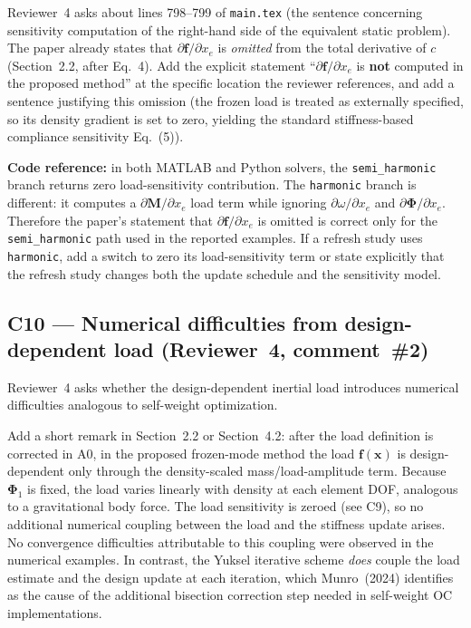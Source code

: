 \documentclass[12pt,a4paper]{article}
\begin{document}
Reviewer~4 asks about lines 798--799 of \texttt{main.tex} (the sentence
concerning sensitivity computation of the right-hand side of the
equivalent static problem). The paper already states that
$\partial\mathbf{f}/\partial x_e$ is \emph{omitted} from the total
derivative of $c$ (Section~2.2, after Eq.~4). Add the explicit statement
``$\partial\mathbf{f}/\partial x_e$ is \textbf{not} computed in the
proposed method'' at the specific location the reviewer references, and
add a sentence justifying this omission (the frozen load is treated as
externally specified, so its density gradient is set to zero, yielding the
standard stiffness-based compliance sensitivity Eq.~(5)).

\textbf{Code reference:} in both MATLAB and Python solvers, the
\texttt{semi\_harmonic} branch returns zero load-sensitivity contribution.
The \texttt{harmonic} branch is different: it computes a
$\partial\mathbf{M}/\partial x_e$ load term while ignoring
$\partial\omega/\partial x_e$ and
$\partial\boldsymbol{\Phi}/\partial x_e$.  Therefore the paper's statement
that $\partial\mathbf{f}/\partial x_e$ is omitted is correct only for the
\texttt{semi\_harmonic} path used in the reported examples.  If a refresh
study uses \texttt{harmonic}, add a switch to zero its load-sensitivity term
or state explicitly that the refresh study changes both the update schedule
and the sensitivity model.

\subsection{C10 — Numerical difficulties from design-dependent load (Reviewer~4, comment~\#2)}

Reviewer~4 asks whether the design-dependent inertial load introduces
numerical difficulties analogous to self-weight optimization.

Add a short remark in Section~2.2 or Section~4.2: after the load definition
is corrected in A0, in the proposed frozen-mode method the load
$\mathbf{f}(\mathbf{x})$ is design-dependent only through the density-scaled
mass/load-amplitude term. Because
$\boldsymbol{\Phi}_1$ is fixed, the load varies linearly with density at
each element DOF, analogous to a gravitational body force. The load sensitivity
is zeroed (see C9), so no additional numerical coupling between the load and
the stiffness update arises. No convergence difficulties attributable to this
coupling were observed in the numerical examples. In contrast, the Yuksel
iterative scheme \emph{does} couple the load estimate and the design update at
each iteration, which Munro~(2024) identifies as the cause of the additional
bisection correction step needed in self-weight OC implementations.
\end{document}
